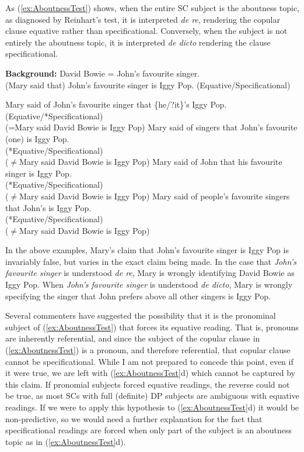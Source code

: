 \documentclass[
]{RCL}
\begin{document}
As (\ref{ex:AboutnessTest}) shows, when the entire SC subject is the aboutness topic, as diagnosed by Reinhart's test, it is interpreted \textit{de re}, rendering the copular clause equative rather than specificational.
Conversely, when the subject is not entirely the aboutness topic, it is interpreted \textit{de dicto} rendering the clause specificational.
\begin{exe}
	\ex\label{ex:AboutnessTest} \textbf{Background:} David Bowie = John's favourite singer.\\
	(Mary said that) John's favourite singer is Iggy Pop. (Equative/Specificational)
	\begin{xlist}
		\ex Mary said of John's favourite singer that \{he/?it\}'s Iggy Pop.\\
		(Equative/*Specificational)\\
		(=Mary said David Bowie is Iggy Pop)
		\ex Mary said of singers that John's favourite (one) is Iggy Pop.\\
		(*Equative/Specificational)\\
		($\neq$Mary said David Bowie is Iggy Pop)
		\ex Mary said of John that his favourite singer is Iggy Pop.\\
		(*Equative/Specificational)\\
		($\neq$Mary said David Bowie is Iggy Pop)
		\ex Mary said of people's favourite singers that John's is Iggy Pop.\\
		(*Equative/Specificational)\\
		($\neq$Mary said David Bowie is Iggy Pop)
	\end{xlist}
\end{exe}
In the above examples, Mary's claim that John's favourite singer is Iggy Pop is invariably false, but varies in the exact claim being made.
In the case that \textit{John's favourite singer} is understood \textit{de re}, Mary is wrongly identifying David Bowie as Iggy Pop.
When \textit{John's favourite singer} is understood \textit{de dicto}, Mary is wrongly specifying the singer that John prefers above all other singers is Iggy Pop.

Several commenters have suggested the possibility that it is the pronominal subject of (\ref{ex:AboutnessTest}) that forces its equative reading.
That is, pronouns are inherently referential, and since the subject of the copular clause in (\ref{ex:AboutnessTest}) is a pronoun, and therefore referential, that copular clause cannot be specificational. 
While I am not prepared to concede this point, even if it were true, we are left with (\ref{ex:AboutnessTest}d) which cannot be captured by this claim.
If pronomial subjects forced equative readings, the reverse could not be true, as most SCs with full (definite) DP subjects are ambiguous with equative readings.
If we were to apply this hypothesis to (\ref{ex:AboutnessTest}d) it would be non-predictive, so we would need a further explanation for the fact that specificational readings are forced when only part of the subject is an aboutness topic as in (\ref{ex:AboutnessTest}d).
\end{document}
